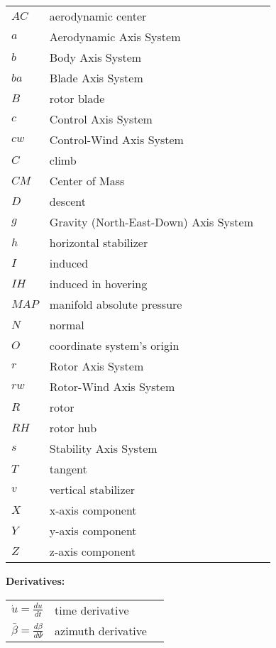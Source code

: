 \begin{longtable}[l]{ l l l }
  $AC$  & aerodynamic center \\
  $a$   & Aerodynamic Axis System \\
  $b$   & Body Axis System \\
  $ba$  & Blade Axis System \\
  $B$   & rotor blade \\
  $c$   & Control Axis System \\
  $cw$  & Control-Wind Axis System \\
  $C$   & climb \\
  $CM$  & Center of Mass \\
  $D$   & descent \\
  $g$   & Gravity (North-East-Down) Axis System \\
  $h$   & horizontal stabilizer \\
  $I$   & induced \\
  $IH$  & induced in hovering \\
  $MAP$ & manifold absolute pressure \\
  $N$   & normal \\
  $O$   & coordinate system’s origin \\
  $r$   & Rotor Axis System \\
  $rw$  & Rotor-Wind Axis System \\
  $R$   & rotor \\
  $RH$  & rotor hub \\
  $s$   & Stability Axis System \\
  $T$   & tangent \\
  $v$   & vertical stabilizer \\
  $X$   & x-axis component \\
  $Y$   & y-axis component \\
  $Z$   & z-axis component \\
\end{longtable}

\noindent \textbf{Derivatives:}

\begin{longtable}[l]{ l l l }
  $\dot u=\frac{du}{dt}$             & time derivative \\
  $\bar \beta=\frac{d\beta}{d\Psi}$  & azimuth derivative \\
\end{longtable}
